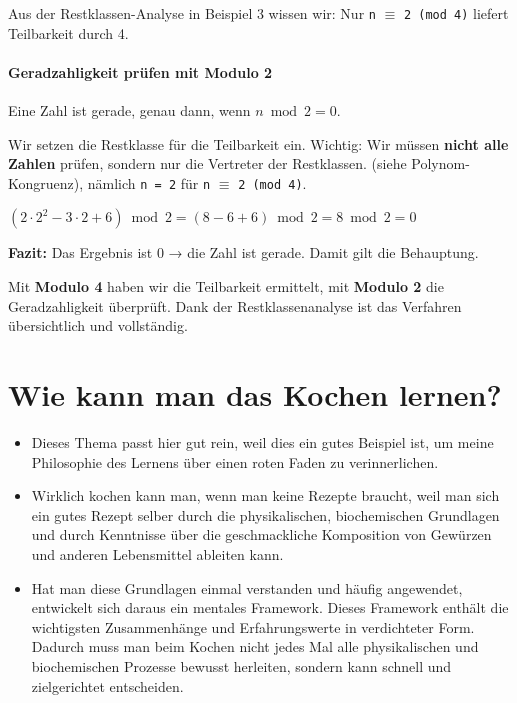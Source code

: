 \documentclass{article}
\begin{document}
      

        Aus der Restklassen-Analyse in Beispiel 3 wissen wir: Nur \texttt{n} $\equiv$ \texttt{2 (mod 4)} liefert Teilbarkeit durch 4.
      


      \paragraph{Geradzahligkeit prüfen mit Modulo 2}
      

        Eine Zahl ist gerade, genau dann, wenn $n \bmod 2 = 0$.
      


      

        Wir setzen die Restklasse für die Teilbarkeit ein. Wichtig: Wir müssen \textbf{nicht alle Zahlen} prüfen, sondern nur die Vertreter der Restklassen. (siehe Polynom-Kongruenz), nämlich \texttt{n = 2} für \texttt{n} $\equiv$ \texttt{2 (mod 4)}.
      


      
      $(2 \cdot 2^2 - 3 \cdot 2 + 6) \bmod 2 = (8 - 6 + 6) \bmod 2 = 8 \bmod 2 = 0$
      


      

        \textbf{Fazit:} Das Ergebnis ist 0 → die Zahl ist gerade. Damit gilt die Behauptung.
      


      

        Mit \textbf{Modulo 4} haben wir die Teilbarkeit ermittelt, mit \textbf{Modulo 2} die Geradzahligkeit überprüft. Dank der Restklassenanalyse ist das Verfahren übersichtlich und vollständig.


        \section{Wie kann man das Kochen lernen?}
      
        \begin{itemize}
          \item Dieses Thema passt hier gut rein, weil dies ein gutes Beispiel ist, um meine Philosophie des Lernens über einen roten Faden zu verinnerlichen.

          \item Wirklich kochen kann man, wenn man keine Rezepte braucht, weil man sich ein gutes Rezept selber durch die physikalischen, biochemischen Grundlagen und durch Kenntnisse über die geschmackliche Komposition von Gewürzen und anderen Lebensmittel ableiten kann.

          \item Hat man diese Grundlagen einmal verstanden und häufig angewendet, entwickelt sich daraus ein mentales Framework. Dieses Framework enthält die wichtigsten Zusammenhänge und Erfahrungswerte in verdichteter Form. Dadurch muss man beim Kochen nicht jedes Mal alle physikalischen und biochemischen Prozesse bewusst herleiten, sondern kann schnell und zielgerichtet entscheiden.

        \end{itemize}
      
\end{document}
